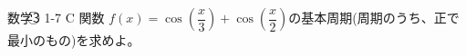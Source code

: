 \documentclass[8pt,dvipdfmx]{article}[b5paper]
\begin{document}
\begin{kousiki}{数学\textcircled{\scriptsize 3} 1-7 C}
関数 $f(x) = \cos\left(\dfrac{x}{3}\right) + \cos\left(\dfrac{x}{2}\right)$の基本周期(周期のうち、正で最小のもの)を求めよ。
\end{kousiki}
\end{document}
